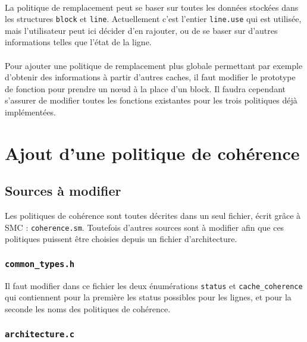 \paragraph{}
La politique de remplacement peut se baser sur toutes les données stockées dans les structures \texttt{block} et \texttt{line}. Actuellement c'est l'entier \texttt{line.use} qui est utilisée, mais l'utilisateur peut ici décider d'en rajouter, ou de se baser sur d'autres informations telles que l'état de la ligne.

\paragraph{}
Pour ajouter une politique de remplacement plus globale permettant par exemple d'obtenir des informations à partir d'autres caches, il faut modifier le prototype de fonction pour prendre un n{\oe}ud à la place d'un block. Il faudra cependant s'assurer de modifier toutes les fonctions existantes pour les trois politiques déjà implémentées.

\section{Ajout d'une politique de cohérence}
\label{tuto_aut}

\subsection{Sources à modifier}

Les politiques de cohérence sont toutes décrites dans un seul fichier, écrit grâce à \textsf{SMC} : \texttt{coherence.sm}. Toutefois d'autres sources sont à modifier afin que ces politiques puissent être choisies depuis un fichier d'architecture.

\subsubsection{\texttt{common\_types.h}}

Il faut modifier dans ce fichier les deux énumérations \texttt{status} et \texttt{cache\_coherence} qui contiennent pour la première les status possibles pour les lignes, et pour la seconde les noms des politiques de cohérence.

\subsubsection{\texttt{architecture.c}}

